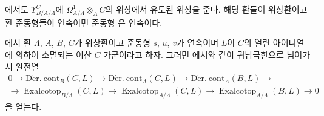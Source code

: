 \begin{env}[20.7.12]
\label{0.20.7.12-ko}
에서도 $\Upsilon^C_{B/A/\Lambda}$에
$\Omega^1_{A/\Lambda}\otimes_A C$의 위상에서 유도된 위상을 준다.
해당 환들이 위상환이고 환 준동형들이 연속이면 준동형
은 연속이다.
\end{env}

\begin{env}[20.7.13]
\label{0.20.7.13-ko}
에서 환 $\Lambda$, $A$, $B$, $C$가 위상환이고
준동형 $s$, $u$, $v$가 연속이며 $L$이 $C$의 열린 아이디얼에 의하여
소멸되는 이산 $C$-가군이라고 하자. 그러면 에서와
같이 귀납극한으로 넘어가서 완전열
\begin{equation}
\tag{20.7.13.1}
\label{0.20.7.13.1-ko}
\begin{split}
  0\to\operatorname{D\acute{e}r.\ cont}_B(C,L)\to
  \operatorname{D\acute{e}r.\ cont}_A(C,L)\to
  \operatorname{D\acute{e}r.\ cont}_A(B,L)\to \\
  \to\operatorname{Exalcotop}_{B/\Lambda}(C,L)\to
  \operatorname{Exalcotop}_{A/\Lambda}(C,L)\to
  \operatorname{Exalcotop}_{A/\Lambda}(B,L)\to0
\end{split}
\end{equation}
을 얻는다.
\end{env}

